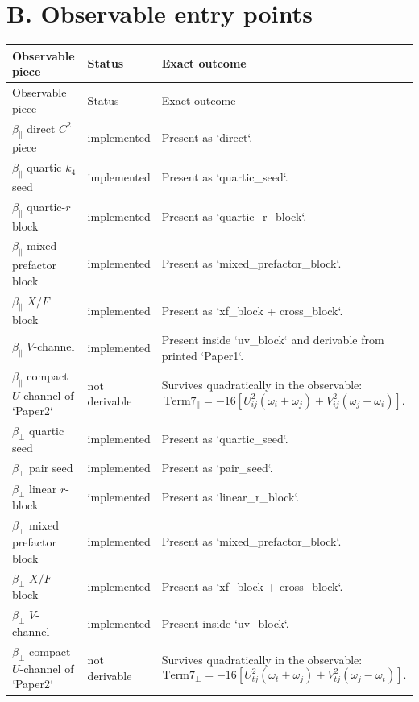 \documentclass[11pt]{article}
\begin{document}
\section*{B. Observable entry points}

\begin{longtable}{>{\raggedright\arraybackslash}p{4.4cm} >{\raggedright\arraybackslash}p{3.2cm} >{\raggedright\arraybackslash}p{6.6cm}}
\toprule
Observable piece & Status & Exact outcome \\
\midrule
\endfirsthead
\toprule
Observable piece & Status & Exact outcome \\
\midrule
\endhead
\(\beta_\parallel\) direct \(C^2\) piece & implemented & Present as `direct`. \\
\(\beta_\parallel\) quartic \(k_4\) seed & implemented & Present as `quartic_seed`. \\
\(\beta_\parallel\) quartic-\(r\) block & implemented & Present as `quartic_r_block`. \\
\(\beta_\parallel\) mixed prefactor block & implemented & Present as `mixed_prefactor_block`. \\
\(\beta_\parallel\) \(X/F\) block & implemented & Present as `xf_block + cross_block`. \\
\(\beta_\parallel\) \(V\)-channel & implemented & Present inside `uv_block` and derivable from printed `Paper1`. \\
\(\beta_\parallel\) compact \(U\)-channel of `Paper2` & not derivable & Survives quadratically in the observable:
\[
\mathrm{Term7}_\parallel=-16[U_{ij}^2(\omega_i+\omega_j)+V_{ij}^2(\omega_j-\omega_i)].
\]
\\
\(\beta_\perp\) quartic seed & implemented & Present as `quartic_seed`. \\
\(\beta_\perp\) pair seed & implemented & Present as `pair_seed`. \\
\(\beta_\perp\) linear \(r\)-block & implemented & Present as `linear_r_block`. \\
\(\beta_\perp\) mixed prefactor block & implemented & Present as `mixed_prefactor_block`. \\
\(\beta_\perp\) \(X/F\) block & implemented & Present as `xf_block + cross_block`. \\
\(\beta_\perp\) \(V\)-channel & implemented & Present inside `uv_block`. \\
\(\beta_\perp\) compact \(U\)-channel of `Paper2` & not derivable & Survives quadratically in the observable:
\[
\mathrm{Term7}_\perp=-16[U_{tj}^2(\omega_t+\omega_j)+V_{tj}^2(\omega_j-\omega_t)].
\]
\\
\bottomrule
\end{longtable}
\end{document}
